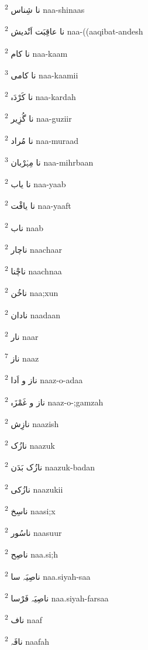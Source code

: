 \documentclass[12pt]{article}
\begin{document}
\begin{multicols}{5}
{\ur نا شِناس}   \textsuperscript{2} naa-shinaas

{\ur نا عاقِبَت اَنْدیش}   \textsuperscript{2} naa-((aaqibat-andesh

{\ur نا کام}   \textsuperscript{2} naa-kaam

{\ur نا کامی}   \textsuperscript{3} naa-kaamii

{\ur نا کَرْدَہ}   \textsuperscript{2} naa-kardah

{\ur نا گُزِیر}   \textsuperscript{2} naa-guziir

{\ur نا مُراد}   \textsuperscript{2} naa-muraad

{\ur نا مِہْرْبان}   \textsuperscript{3} naa-mihrbaan

{\ur نا یاب}   \textsuperscript{2} naa-yaab

{\ur نا یافْت}   \textsuperscript{2} naa-yaaft

{\ur ناب}   \textsuperscript{2} naab

{\ur ناچار}   \textsuperscript{2} naachaar

{\ur ناچْنا}   \textsuperscript{2} naachnaa

{\ur ناخُن}   \textsuperscript{2} naa;xun

{\ur نادان}   \textsuperscript{2} naadaan

{\ur نار}   \textsuperscript{2} naar

{\ur ناز}   \textsuperscript{7} naaz

{\ur ناز و اَدا}   \textsuperscript{2} naaz-o-adaa

{\ur ناز و غَمْزَہ}   \textsuperscript{2} naaz-o-;gamzah

{\ur نازِش}   \textsuperscript{2} naazish

{\ur نازُک}   \textsuperscript{2} naazuk

{\ur نازُک بَدَن}   \textsuperscript{2} naazuk-badan

{\ur نازُکی}   \textsuperscript{2} naazukii

{\ur ناسِخ}   \textsuperscript{2} naasi;x

{\ur ناسُور}   \textsuperscript{2} naasuur

{\ur ناصِح}   \textsuperscript{2} naa.si;h

{\ur ناصِیَہ سا}   \textsuperscript{2} naa.siyah-saa

{\ur ناصِیَہ فَرْسا}   \textsuperscript{2} naa.siyah-farsaa

{\ur ناف}   \textsuperscript{2} naaf

{\ur نافَہ}   \textsuperscript{2} naafah


\end{multicols}
\end{document}
